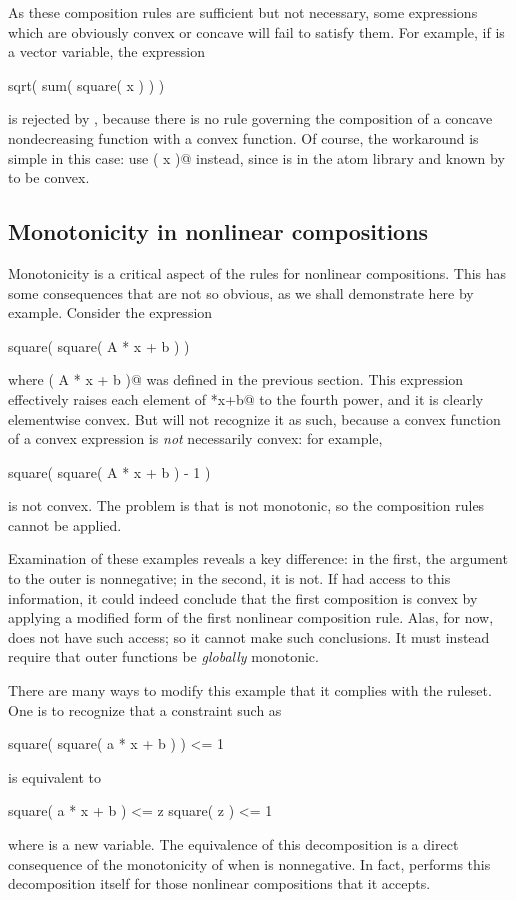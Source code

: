\documentclass[12pt]{article}
\begin{document}
As these composition rules are sufficient but not necessary,
some expressions which are obviously convex or concave will fail to
satisfy them. For example, if \verb@x@ is a vector variable, the
expression
\begin{code}
	sqrt( sum( square( x ) ) )
\end{code}
is rejected by \cvx, because there is no rule governing the composition
of a concave nondecreasing function with a convex function.
Of course, the workaround is simple in this case: use \verb@norm( x )@ instead,
since \verb@norm@ is in the atom library and known by \cvx to be convex.

\subsection{Monotonicity in nonlinear compositions}

Monotonicity is a critical aspect of the rules for nonlinear compositions. 
This has some consequences that are not so obvious, as we shall demonstrate here
by example. Consider the expression
\begin{code}
	square( square( A * x + b ) )
\end{code}
where \verb@square( A * x + b )@ was defined in the previous section.
This expression effectively raises each element of \verb@A*x+b@ to the fourth
power, and it is clearly elementwise convex. But
\cvx will not recognize it as such, because a convex function of a convex
expression is \emph{not} necessarily convex: for example,
\begin{code}
	square( square( A * x + b ) - 1 )
\end{code}
is not convex. The problem is that \verb@square@ is not monotonic,
so the composition rules cannot be applied.

Examination of these examples reveals a key difference:
in the first, the argument to the outer \verb@square@ is nonnegative;
in the second, it is not. If \cvx had access to this information, it could
indeed conclude that the first composition is convex by applying a
modified form of the first nonlinear composition rule.
Alas, for now, \cvx does not have such access; so it cannot make
such conclusions.
It must instead require
that outer functions be \emph{globally} monotonic.

There are many ways to modify this example that it complies with the ruleset.
One is to recognize that a constraint such as
\begin{code}
	square( square( a * x + b ) ) <= 1
\end{code}
is equivalent to
\begin{code}
	square( a * x + b ) <= z
	square( z ) <= 1
\end{code}
where \verb@z@ is a new variable. The equivalence of this decomposition
is a direct consequence of the monotonicity of 
\verb@square@ when \verb@z@
is nonnegative. In fact, \cvx performs this decomposition itself for
those nonlinear compositions that it accepts.
\end{document}
